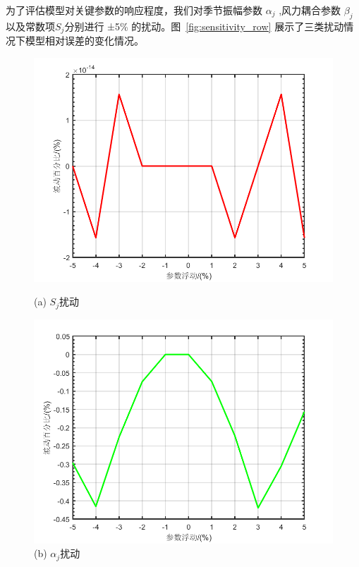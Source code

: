 \documentclass[a4paper,12pt]{article}
\begin{document}
	为了评估模型对关键参数的响应程度，我们对季节振幅参数 $\alpha_j$ ,风力耦合参数 $\beta_j$ 以及常数项$S_j$分别进行 ±5\% 的扰动。图~\ref{fig:sensitivity_row} 
	展示了三类扰动情况下模型相对误差的变化情况。
	\begin{figure}[htbp]
		\centering
		\begin{minipage}[t]{0.32\textwidth}
			\centering
			\includegraphics[width=\textwidth]{canshu1.png}
			\caption*{(a) $S_j$扰动}
		\end{minipage}
		\begin{minipage}[t]{0.32\textwidth}
			\centering
			\includegraphics[width=\textwidth]{canshu2.png}
			\caption*{(b) $\alpha_j$扰动}
		\end{minipage}

\end{figure}
\end{document}
